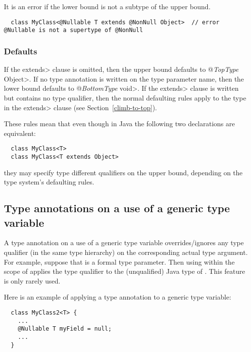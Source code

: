 It is an error if the lower bound is not a subtype of the upper bound.

\begin{Verbatim}
  class MyClass<@Nullable T extends @NonNull Object>  // error @Nullable is not a supertype of @NonNull
\end{Verbatim}


\subsubsection{Defaults\label{generics-defaults}}
If the \<extends> clause is omitted,
then the upper bound defaults to \<@\emph{TopType} Object>.
If no type annotation is written on the type parameter name,
then the lower bound defaults to \<@\emph{BottomType} void>.
If the \<extends> clause is written but contains no type qualifier,
then the normal defaulting rules apply to the type in the \<extends>
clause (see Section~\ref{climb-to-top}).

These rules mean that even though in Java the following two declarations
are equivalent:

\begin{Verbatim}
  class MyClass<T>
  class MyClass<T extends Object>
\end{Verbatim}

\noindent
they may specify type different qualifiers on the upper bound, depending on
the type system's defaulting rules.



\subsection{Type annotations on a use of a generic type variable\label{type-variable-use}}

A type annotation on a use of a generic type variable overrides/ignores any type
qualifier (in the same type hierarchy) on the corresponding actual type
argument.  For example, suppose that  is a formal type parameter.
Then using  within the scope of  applies the type
qualifier  to the (unqualified) Java type of \@.
This feature is only rarely used.

Here is an example of applying a type annotation to a generic type
variable:

\begin{Verbatim}
  class MyClass2<T> {
    ...
    @Nullable T myField = null;
    ...
  }
\end{Verbatim}

